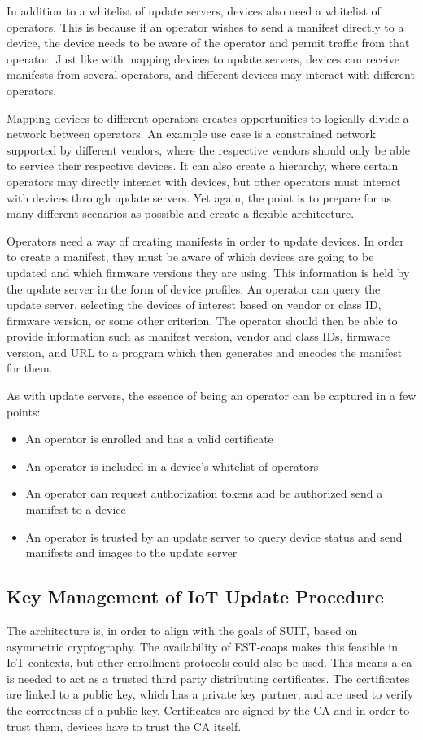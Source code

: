 \documentclass[0-thesis.tex]{subfiles}
\begin{document}
In addition to a whitelist of update servers, devices also need a whitelist of operators.
This is because if an operator wishes to send a manifest directly to a device, the device
needs to be aware of the operator and permit traffic from that operator. Just like with
mapping devices to update servers, devices can receive manifests from several operators,
and different devices may interact with different operators. 

Mapping devices to different operators creates opportunities to logically divide a network
between operators. An example use case is a constrained network supported by different
vendors, where the respective vendors should only be able to service their respective
devices. It can also create a hierarchy, where certain operators may directly interact
with devices, but other operators must interact with devices through update servers. Yet
again, the point is to prepare for as many different scenarios as possible and create a
flexible architecture.

Operators need a way of creating manifests in order to update devices. In order to create
a manifest, they must be aware of which devices are going to be updated and which firmware
versions they are using. This information is held by the update server in the form of
device profiles. An operator can query the update server, selecting the devices of
interest based on vendor or class ID, firmware version, or some other criterion. The
operator should then be able to provide information such as manifest version, vendor and
class IDs, firmware version, and URL to a program which then generates and encodes the
manifest for them. 

As with update servers, the essence of being an operator can be captured in a few points:

\begin{itemize}
    \item An operator is enrolled and has a valid certificate
    \item An operator is included in a device's whitelist of operators
    \item An operator can request authorization tokens and be authorized send a manifest
            to a device
    \item An operator is trusted by an update server to query device status and send
            manifests and images to the update server
\end{itemize}

\subsection{Key Management of IoT Update Procedure}
\label{ssec:key-management}
The architecture is, in order to align with the goals of SUIT, based on asymmetric
cryptography. The availability of EST-coaps makes this feasible in IoT contexts, but other
enrollment protocols could also be used. This means a \acrfull{ca} is needed to act as
a trusted third party distributing certificates. The certificates are linked to a public
key, which has a private key partner, and are used to verify the correctness of a public
key. Certificates are signed by the CA and in order to trust them, devices have to trust
the CA itself.
\end{document}
